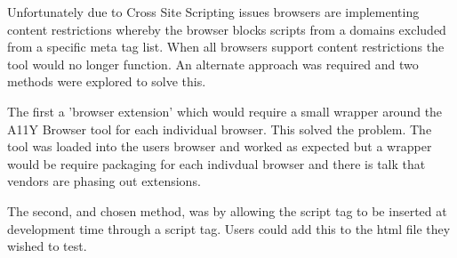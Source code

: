 Unfortunately due to Cross Site Scripting issues browsers are implementing
content restrictions whereby the browser blocks scripts from a
domains excluded from a specific meta tag list. When all browsers support
content restrictions the tool would no longer function. An alternate approach
was required and two methods were explored to solve this.

The first a 'browser extension' which would require a small wrapper around
the A11Y Browser tool for each individual browser. This solved the problem.
The tool was loaded into the users browser and worked as expected but a
wrapper would be require packaging for each indivdual browser and there is
talk that vendors are phasing out extensions.

The second, and chosen method, was by allowing the script tag to be inserted
at development time through a script tag. Users could add this to the html
file they wished to test.


%
%
%
%
